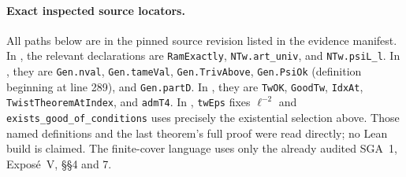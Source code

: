 \paragraph{Exact inspected source locators.}
All paths below are in the pinned source revision
listed in the evidence manifest.
In
,
the relevant declarations are \texttt{RamExactly},
\texttt{NTw.art\_univ}, and \texttt{NTw.psiL\_l}.
In , they are
\texttt{Gen.nval}, \texttt{Gen.tameVal},
\texttt{Gen.TrivAbove}, \texttt{Gen.PsiOk}
(definition beginning at line 289), and
\texttt{Gen.partD}.
In , they are
\texttt{TwOK}, \texttt{GoodTw}, \texttt{IdxAt},
\texttt{TwistTheoremAtIndex}, and \texttt{admT4}.
In , \texttt{twEps} fixes
$\ell^{-2}$ and \texttt{exists\_good\_of\_conditions}
uses precisely the existential selection above.
Those named definitions and the last theorem's
full proof were read directly; no Lean build is
claimed.  The finite-cover language uses only
the already audited SGA~1, Expos\'e~V, \S\S4 and 7.
